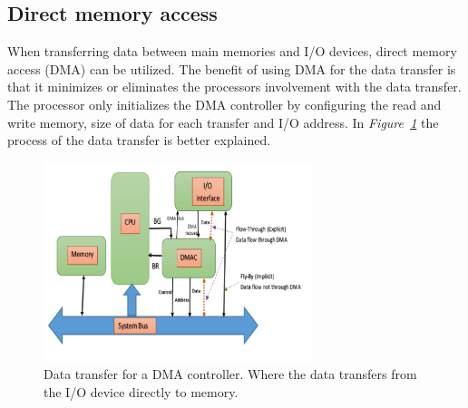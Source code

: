





\subsection{Direct memory access}

When transferring data between main memories and I/O devices, direct memory access (DMA) can be utilized.
The benefit of using DMA for the data transfer is that it minimizes or eliminates the processors involvement with the data transfer.
The processor only initializes the DMA controller by configuring the read and write memory, size of data for each transfer and I/O address.
In \textit{Figure~\ref{fig:DMAcontroller}} the process of the data transfer is better explained.

\begin{figure}[h]
    \centering
    \includegraphics[width=0.70\textwidth]{graphics/DMA.png}
    \caption{Data transfer for a DMA controller. Where the data transfers from the I/O device directly to memory. \cite{ahmed_design_2019}}
    \label{fig:DMAcontroller}
\end{figure}

